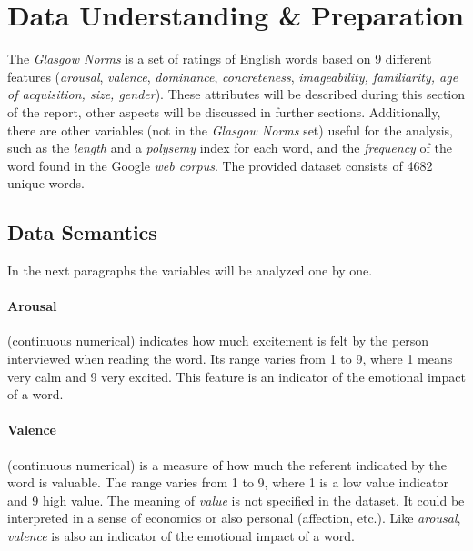 \documentclass[a4paper,11pt,dvipsnames]{article}
\begin{document}
		\makeatother
		\restoregeometry
	\onecolumn \tableofcontents
		\newpage
\section{Data Understanding \& Preparation}
The \textit{Glasgow Norms} is a set of ratings of English words based on 9 different features (\textit{arousal}, \textit{valence}, \textit{dominance}, \textit{concreteness}, \textit{imageability, familiarity, age of acquisition, size, gender}). These attributes will be described during this section of the report, other aspects will be discussed in further sections. Additionally, there are other variables (not in the \textit{Glasgow Norms} set) useful for the analysis, such as the \textit{length} and a \textit{polysemy} index for each word, and the \textit{frequency} of the word found in the Google \textit{web corpus}. The provided dataset consists of 4682 unique words. 


\subsection{Data Semantics}\label{semantic}
In the next paragraphs the variables will be analyzed one by one. 




\paragraph{Arousal} (continuous numerical) indicates how much excitement is felt by the person interviewed when reading the word. Its range varies from 1 to 9, where 1 means very calm and 9 very excited. This feature is an indicator of the emotional impact of a word.
%
\paragraph{Valence} (continuous numerical) is a measure of how much the referent indicated by the word is valuable. The range varies from 1 to 9, where 1 is a low value indicator and 9 high value. The meaning of \textit{value} is not specified in the dataset. It could be interpreted in a sense of economics or also personal (affection, etc.). Like \textit{arousal}, \textit{valence} is also an indicator of the emotional impact of a word.
%
\end{document}
